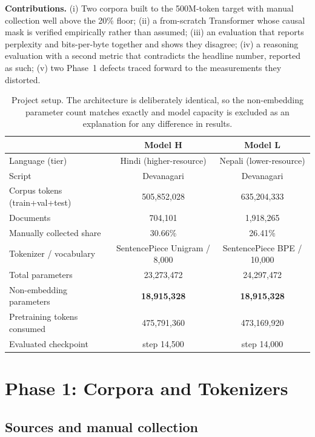 \documentclass[10pt]{article}
\begin{document}
\textbf{Contributions.} (i) Two corpora built to the 500M-token target with manual
collection well above the 20\% floor; (ii) a from-scratch Transformer whose causal
mask is verified empirically rather than assumed; (iii) an evaluation that reports
perplexity and bits-per-byte together and shows they disagree; (iv) a reasoning
evaluation with a second metric that contradicts the headline number, reported as
such; (v) two Phase~1 defects traced forward to the measurements they distorted.

\begin{table}[!htb]
\centering\small
\caption{Project setup. The architecture is deliberately identical, so the
non-embedding parameter count matches exactly and model capacity is excluded as an
explanation for any difference in results.}
\label{tab:setup}
\begin{tabular}{lcc}
\toprule
& \textbf{Model H} & \textbf{Model L} \\
\midrule
Language (tier) & Hindi (higher-resource) & Nepali (lower-resource) \\
Script & Devanagari & Devanagari \\
Corpus tokens (train+val+test) & 505{,}852{,}028 & 635{,}204{,}333 \\
Documents & 704{,}101 & 1{,}918{,}265 \\
Manually collected share & 30.66\% & 26.41\% \\
Tokenizer / vocabulary & SentencePiece Unigram / 8{,}000 & SentencePiece BPE / 10{,}000 \\
Total parameters & 23{,}273{,}472 & 24{,}297{,}472 \\
Non-embedding parameters & \textbf{18{,}915{,}328} & \textbf{18{,}915{,}328} \\
Pretraining tokens consumed & 475{,}791{,}360 & 473{,}169{,}920 \\
Evaluated checkpoint & step 14{,}500 & step 14{,}000 \\
\bottomrule
\end{tabular}
\end{table}

\section{Phase 1: Corpora and Tokenizers}

\subsection{Sources and manual collection}
\end{document}
